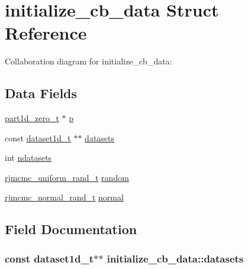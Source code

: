 \hypertarget{structinitialize__cb__data}{}\section{initialize\+\_\+cb\+\_\+data Struct Reference}
\label{structinitialize__cb__data}


Collaboration diagram for initialize\+\_\+cb\+\_\+data\+:
\subsection*{Data Fields}
\begin{DoxyCompactItemize}
\item 
\hyperlink{part1d__zero_8h_a03a856fcdfe27544c68d2d1a7cc16dc3}{part1d\+\_\+zero\+\_\+t} $\ast$ \hyperlink{structinitialize__cb__data_ab7819725ce802ec4ac58f1636de92246}{p}
\item 
const \hyperlink{dataset1d_8h_a232f8372957af83ed6a261e9b89dd8f6}{dataset1d\+\_\+t} $\ast$$\ast$ \hyperlink{structinitialize__cb__data_a6a4f61ff1fbfb21385c22db64326c1d9}{datasets}
\item 
int \hyperlink{structinitialize__cb__data_ad1a2f4f225a9e540e4c34439f7a7496d}{ndatasets}
\item 
\hyperlink{rjmcmc__random_8h_accc36e83459ada552d8f70962190dac0}{rjmcmc\+\_\+uniform\+\_\+rand\+\_\+t} \hyperlink{structinitialize__cb__data_a3007992befe57b32b4b6de053f10ac68}{random}
\item 
\hyperlink{rjmcmc__random_8h_a498625755d377b68ad37c9ab360e83b0}{rjmcmc\+\_\+normal\+\_\+rand\+\_\+t} \hyperlink{structinitialize__cb__data_a445e6f7516e6031fbc47d58592ae23cd}{normal}
\end{DoxyCompactItemize}


\subsection{Field Documentation}
\subsubsection[{\texorpdfstring{datasets}{datasets}}]{\setlength{\rightskip}{0pt plus 5cm}const {\bf dataset1d\+\_\+t}$\ast$$\ast$ initialize\+\_\+cb\+\_\+data\+::datasets}\hypertarget{structinitialize__cb__data_a6a4f61ff1fbfb21385c22db64326c1d9}{}\label{structinitialize__cb__data_a6a4f61ff1fbfb21385c22db64326c1d9}


